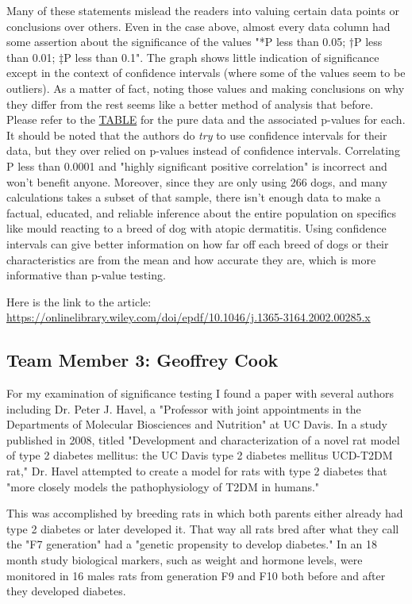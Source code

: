 \documentclass{article}
\numberwithin{equation}{section}
\begin{document}
Many of these statements mislead the readers into valuing certain data points or conclusions over others. Even in the case above, almost every data column had some assertion about the significance of the values "*P less than 0.05; †P less than 0.01; ‡P less than 0.1". The graph shows little indication of significance except in the context of confidence intervals (where some of the values seem to be outliers). As a matter of fact, noting those values and making conclusions on why they differ from the rest seems like a better method of analysis that before. Please refer to the \href{https://onlinelibrary.wiley.com/doi/full/10.1046/j.1365-3164.2002.00285.x#t3}{TABLE} for the pure data and the associated p-values for each. It should be noted that the authors do \textit{try} to use confidence intervals for their data, but they over relied on p-values instead of confidence intervals. Correlating P less than 0.0001 and "highly significant positive correlation" is incorrect and won't benefit anyone. Moreover, since they are only using 266 dogs, and many calculations takes a subset of that sample, there isn't enough data to make a factual, educated, and reliable inference about the entire population on specifics like mould reacting to a breed of dog with atopic dermatitis. Using confidence intervals can give better information on how far off each breed of dogs or their characteristics are from the mean and how accurate they are, which is more informative than p-value testing.

Here is the link to the article: \url{https://onlinelibrary.wiley.com/doi/epdf/10.1046/j.1365-3164.2002.00285.x}

\subsection{Team Member 3: Geoffrey Cook}
For my examination of significance testing I found a paper with several authors including Dr. Peter J. Havel, a "Professor with joint appointments in the Departments of Molecular Biosciences and Nutrition" at UC Davis.  In a study published in 2008, titled "Development and characterization of a novel rat model of type 2 diabetes mellitus: the UC Davis type 2 diabetes mellitus UCD-T2DM rat," Dr. Havel attempted to create a model for rats with type 2 diabetes that "more closely models the pathophysiology of T2DM in humans."

This was accomplished by breeding rats in which both parents either already had type 2 diabetes or later developed it.  That way all rats bred after what they call the "F7 generation" had a "genetic propensity to develop diabetes." In an 18 month study biological markers, such as weight and hormone levels, were monitored in 16 males rats from generation F9 and F10 both before and after they developed diabetes. 
\end{document}
